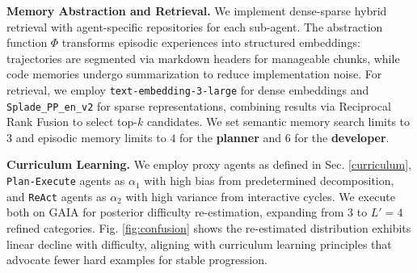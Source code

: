 \documentclass{article} %
\begin{document}
\textbf{Memory Abstraction and Retrieval.} We implement dense-sparse hybrid retrieval \citep{lewis2020retrieval} with agent-specific repositories for each sub-agent. The abstraction function $\Phi$ transforms episodic experiences into structured embeddings: trajectories are segmented via markdown headers for manageable chunks, while code memories undergo summarization to reduce implementation noise. For retrieval, we employ \texttt{text-embedding-3-large} for dense embeddings and \texttt{Splade\_PP\_en\_v2} \citep{damodaran2024splade} for sparse representations, combining results via Reciprocal Rank Fusion \citep{cormack2009reciprocal} to select top-$k$ candidates. We set semantic memory search limits to 3 and episodic memory limits to $4$ for the \textbf{planner} and $6$ for the \textbf{developer}.

\textbf{Curriculum Learning.} We employ proxy agents as defined in Sec. \ref{curriculum}, \texttt{Plan-Execute} agents \citep{smolagents} as $\alpha_1$ with high bias from predetermined decomposition, and \texttt{ReAct} agents \citep{yao2023react} as $\alpha_2$ with high variance from interactive cycles. We execute both on GAIA for posterior difficulty re-estimation, expanding from 3 to $L' = 4$ refined categories. Fig. \ref{fig:confusion} shows the re-estimated distribution exhibits linear decline with difficulty, aligning with curriculum learning principles \citep{bengio2009curriculum} that advocate fewer hard examples for stable progression.
\end{document}
